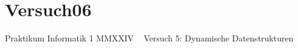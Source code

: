 \chapter{Versuch06}
\hypertarget{index}{}\label{index}
Praktikum Informatik 1 MMXXIV ~\newline
 Versuch 5\+: Dynamische Datenstrukturen 